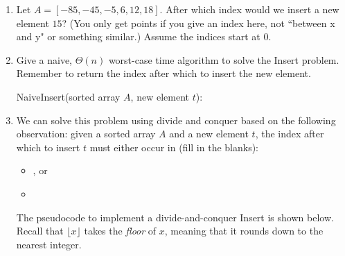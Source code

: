 \documentclass[11pt]{article}
\begin{document}
\begin{enumerate}
\subsection*{From Fall 2025 Exam 2 Practice 1}
In this section, we will think about the computational problem of where to
insert a new element into a sorted array. Specifically, we will return the
position \emph{after which} to insert the element. For example, in the array
$A=[5, 40, 44, 600]$, we would insert the element $41$ after index $1$. If we
need to insert the new element before the current first element, we return $-1$.

\item Let $A=[-85, -45, -5, 6, 12, 18]$. After which index would we insert a new
element $15$? (You only get points if you give an index here, not ``between x
and y" or something similar.) Assume the indices start at $0$.

\vspace{1in}

\item Give a naive, $\Theta(n)$ worst-case time algorithm to solve the Insert
problem. Remember to return the index after which to insert the new element.

\begin{algo}
    NaiveInsert(sorted array $A$, new element $t$):\+\\[2in]
    \hspace{5in}

\end{algo}



\item We can solve this problem using divide and conquer based on the following
observation: given a sorted array $A$ and a new element $t$, the index after
which to insert $t$ must either occur in (fill in the blanks):
\begin{itemize}
    \item \underline{\hspace{4in}}, or
    \item \underline{\hspace{4in}}
\end{itemize}

\newpage

The pseudocode to implement a divide-and-conquer Insert is shown below. Recall
that $\lfloor x \rfloor$ takes the \emph{floor} of $x$, meaning that it rounds
down to the nearest integer.


\end{enumerate}
\end{document}
